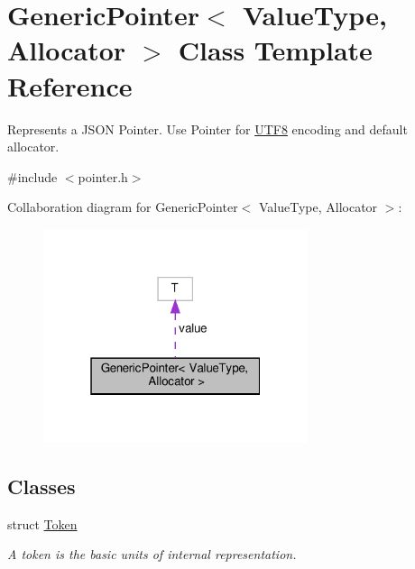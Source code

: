 \hypertarget{classGenericPointer}{}\section{Generic\+Pointer$<$ Value\+Type, Allocator $>$ Class Template Reference}
\label{classGenericPointer}


Represents a J\+S\+ON Pointer. Use Pointer for \hyperlink{structUTF8}{U\+T\+F8} encoding and default allocator.  




{\ttfamily \#include $<$pointer.\+h$>$}



Collaboration diagram for Generic\+Pointer$<$ Value\+Type, Allocator $>$\+:
\nopagebreak
\begin{figure}[H]
\begin{center}
\leavevmode
\includegraphics[width=220pt]{classGenericPointer__coll__graph}
\end{center}
\end{figure}
\subsection*{Classes}
\begin{DoxyCompactItemize}
\item 
struct \hyperlink{structGenericPointer_1_1Token}{Token}
\begin{DoxyCompactList}\small\item\em A token is the basic units of internal representation. \end{DoxyCompactList}\end{DoxyCompactItemize}
